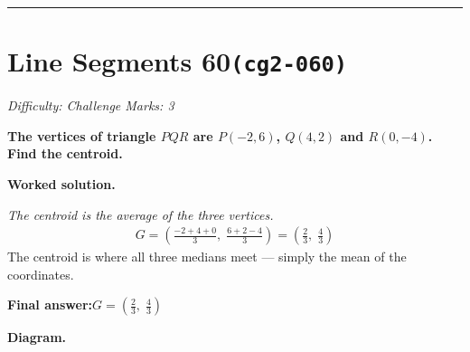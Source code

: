 \documentclass[11pt]{article}
\newcommand{\question}[1]{\par\medskip\noindent\textbf{#1}\par}
\begin{document}
\medskip\hrule

\section*{Line Segments 60\quad\small\texttt{(cg2-060)}}
\textit{Difficulty: Challenge \quad\textbar\quad Marks: 3}

\question{The vertices of triangle \( PQR \) are \( P(-2, 6) \), \( Q(4, 2) \) and \( R(0, -4) \). Find the centroid.}

\textbf{Worked solution.}

\textit{The centroid is the average of the three vertices.}
\[\begin{gathered}
G = \left(\frac{-2+4+0}{3},\; \frac{6+2-4}{3}\right) = \left(\frac{2}{3},\; \frac{4}{3}\right)
\end{gathered}\]
The centroid is where all three medians meet --- simply the mean of the coordinates.

\begin{answerbox}
\textbf{Final answer:}\quad \(\displaystyle G = \left(\frac{2}{3},\; \frac{4}{3}\right)\)
\end{answerbox}
\textbf{Diagram.}
\end{document}
